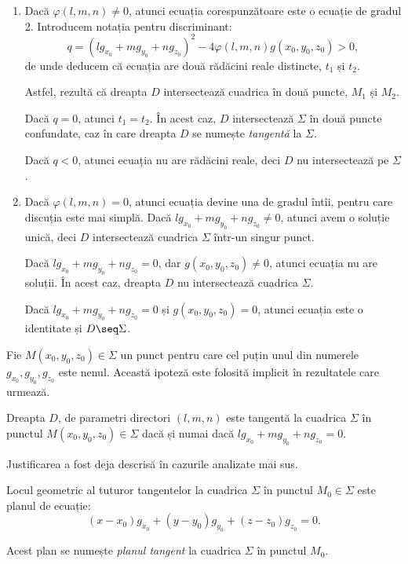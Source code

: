 \begin{enumerate}[(1)]
	\item Dacă $\varphi(l, m, n) \neq 0$, atunci ecuația corespunzătoare
este o ecuație de gradul 2. Introducem notația pentru discriminant: 
 \[
	q = (lg_{x_0} + mg_{y_0} + ng_{z_0})^2 - 
	    4\varphi(l, m, n)g(x_0, y_0, z_0) > 0,
\]
de unde deducem că ecuația are două rădăcini reale distincte, $t_1$ și $t_2$.

Astfel, rezultă că dreapta $D$ intersectează cuadrica în două puncte, $M_1$ și
$M_2$. 

Dacă $q = 0$, atunci $t_1 = t_2$. În acest caz, $D$ intersectează $\Sigma$ în
două puncte confundate, caz în care dreapta $D$ se numește \emph{tangentă} la
$\Sigma$.

Dacă $q < 0$, atunci ecuația nu are rădăcini reale, deci $D$ nu intersectează
pe $\Sigma$.

    \item Dacă $\varphi(l, m, n) = 0$, atunci ecuația devine una de gradul
    întîi, pentru care discuția este mai simplă. Dacă $lg_{x_0} + mg_{y_0} +
ng_{z_0} \neq 0$, atunci avem o soluție unică, deci $D$ intersectează
cuadrica $\Sigma$ într-un singur punct.

Dacă $lg_{x_0} + mg_{y_0} + ng_{z_0} = 0$, dar $g(x_0, y_0, z_0) \neq 0$, atunci
ecuația nu are soluții. În acest caz, dreapta $D$ nu intersectează cuadrica
$\Sigma$.

Dacă $lg_{x_0} + mg_{y_0} + ng_{z_0} = 0$ și $g(x_0, y_0, z_0) = 0$, atunci
ecuația este o identitate și $D \seq \Sigma$.

\end{enumerate}

Fie $M(x_0, y_0, z_0) \in \Sigma$ un punct pentru care cel puțin unul din
numerele $g_{x_0}, g_{y_0}, g_{z_0}$ este nenul. Această ipoteză este folosită
implicit în rezultatele care urmează.

\begin{theorem}
	Dreapta $D$, de parametri directori $(l, m, n)$ este tangentă la cuadrica
$\Sigma$ în punctul $M(x_0, y_0, z_0) \in \Sigma$ dacă și numai dacă
$lg_{x_0} + mg_{y_0} + ng_{z_0} = 0$.
\end{theorem}

Justificarea a fost deja descrisă în cazurile analizate mai sus.

\begin{theorem}
	Locul geometric al tuturor tangentelor la cuadrica $\Sigma$ în punctul
$M_0 \in \Sigma$ este planul de ecuație: 
 \[
	(x - x_0)g_{x_0} + (y - y_0)g_{y_0} + (z - z_0) g_{z_0} = 0.
\]

Acest plan se numește \emph{planul tangent} la cuadrica $\Sigma$ în punctul
$M_0$.
\end{theorem}

